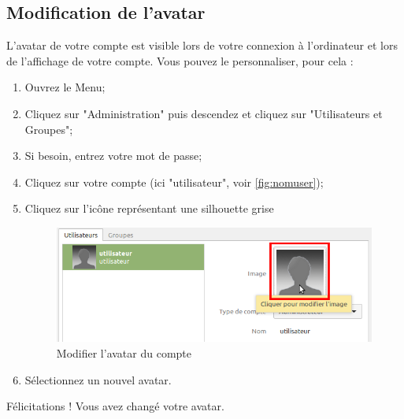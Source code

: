 \documentclass[12pt]{book}
\begin{document}
	\subsection{Modification de l'avatar}
		L'avatar de votre compte est visible lors de votre connexion à l'ordinateur et lors de l'affichage de votre compte.
		Vous pouvez le personnaliser, pour cela :
		\begin{enumerate}
			\item Ouvrez le Menu;
			\item Cliquez sur "Administration" puis descendez et cliquez sur "Utilisateurs et Groupes";
			\item Si besoin, entrez votre mot de passe;
			\item Cliquez sur votre compte (ici "utilisateur", voir \ref{fig:nomuser});
			\item Cliquez sur l'icône représentant une silhouette grise
			\begin{figure}[h]
				\centering
				\includegraphics[width=.78\textwidth]{include/avataruser.png}
				\caption{Modifier l'avatar du compte}
				\label{fig:avataruser}
			\end{figure}
			\item Sélectionnez un nouvel avatar.
		\end{enumerate}
		Félicitations ! Vous avez changé votre avatar.
\end{document}
